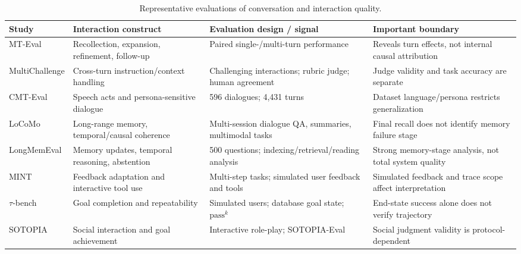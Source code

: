 \begin{table}[t]
\centering
\footnotesize
\caption{Representative evaluations of conversation and interaction quality.}
\label{tab:conversation-quality-studies}
\begin{tabular}{p{} p{} p{} p{}}
\toprule
\textbf{Study} & \textbf{Interaction construct} & \textbf{Evaluation design / signal} & \textbf{Important boundary} \\
\midrule
MT-Eval \cite{kwan2024mteval} & Recollection, expansion, refinement, follow-up & Paired single-/multi-turn performance & Reveals turn effects, not internal causal attribution \\
MultiChallenge \cite{deshpande2025multichallenge} & Cross-turn instruction/context handling & Challenging interactions; rubric judge; human agreement & Judge validity and task accuracy are separate \\
CMT-Eval \cite{tian2025cmteval} & Speech acts and persona-sensitive dialogue & 596 dialogues; 4,431 turns & Dataset language/persona restricts generalization \\
LoCoMo \cite{maharana2024locomo} & Long-range memory, temporal/causal coherence & Multi-session dialogue QA, summaries, multimodal tasks & Final recall does not identify memory failure stage \\
LongMemEval \cite{wu2025longmemeval} & Memory updates, temporal reasoning, abstention & 500 questions; indexing/retrieval/reading analysis & Strong memory-stage analysis, not total system quality \\
MINT \cite{wang2024mint} & Feedback adaptation and interactive tool use & Multi-step tasks; simulated user feedback and tools & Simulated feedback and trace scope affect interpretation \\
$\tau$-bench \cite{yao2025taubench} & Goal completion and repeatability & Simulated users; database goal state; $\mathrm{pass}^{k}$ & End-state success alone does not verify trajectory \\
SOTOPIA \cite{zhou2024sotopia} & Social interaction and goal achievement & Interactive role-play; SOTOPIA-Eval & Social judgment validity is protocol-dependent \\
\bottomrule
\end{tabular}
\end{table}


